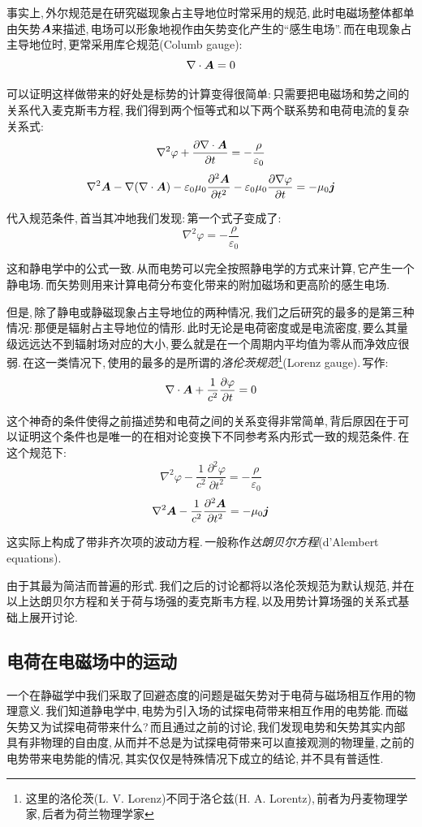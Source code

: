 事实上,\,外尔规范是在研究磁现象占主导地位时常采用的规范,\,此时电磁场整体都单由矢势$\boldsymbol{A}$来描述,\,电场可以形象地视作由矢势变化产生的``感生电场''.\,而在电现象占主导地位时,\,更常采用库仑规范(Columb gauge):
\[\nabla\cdot \boldsymbol{A}=0\]

可以证明这样做带来的好处是标势的计算变得很简单:\,只需要把电磁场和势之间的关系代入麦克斯韦方程,\,我们得到两个恒等式和以下两个联系势和电荷电流的复杂关系式:
\[\nabla^2\varphi+\frac{\partial\nabla\cdot\boldsymbol{A}}{\partial t}=-\frac{\rho}{\varepsilon_0}\]
\[\nabla^2\boldsymbol{A}-\nabla(\nabla\cdot\boldsymbol{A})-\varepsilon_0\mu_0\frac{\partial^2\boldsymbol{A}}{\partial t^2}-\varepsilon_0\mu_0\frac{\partial\nabla\varphi}{\partial t}=-\mu_0\boldsymbol{j}\]

代入规范条件,\,首当其冲地我们发现:\,第一个式子变成了:
\[\nabla^2\varphi=-\frac{\rho}{\varepsilon_0}\]

这和静电学中的公式一致.\,从而电势可以完全按照静电学的方式来计算,\,它产生一个静电场.\,而矢势则用来计算电荷分布变化带来的附加磁场和更高阶的感生电场.

但是,\,除了静电或静磁现象占主导地位的两种情况,\,我们之后研究的最多的是第三种情况:\,那便是辐射占主导地位的情形.\,此时无论是电荷密度或是电流密度,\,要么其量级远远达不到辐射场对应的大小,\,要么就是在一个周期内平均值为零从而净效应很弱.\,在这一类情况下,\,使用的最多的是所谓的\emph{洛伦茨规范}\footnote{这里的洛伦茨(L. V. Lorenz)不同于洛仑兹(H. A. Lorentz),\,前者为丹麦物理学家,\,后者为荷兰物理学家}(Lorenz gauge).\,写作:
\[\nabla\cdot\boldsymbol{A}+\frac{1}{c^2}\frac{\partial \varphi}{\partial t}=0\]

这个神奇的条件使得之前描述势和电荷之间的关系变得非常简单,\,背后原因在于可以证明这个条件也是唯一的在相对论变换下不同参考系内形式一致的规范条件.\,在这个规范下:
\[\nabla^2\varphi-\frac{1}{c^2}\frac{\partial^2\varphi}{\partial t^2}=-\frac{\rho}{\varepsilon_0}\]
\[\nabla^2\boldsymbol{A}-\frac{1}{c^2}\frac{\partial^2\boldsymbol{A}}{\partial t^2}=-\mu_0\boldsymbol{j}\]

这实际上构成了带非齐次项的波动方程.\,一般称作\emph{达朗贝尔方程}(d'Alembert equations).

由于其最为简洁而普遍的形式.\,我们之后的讨论都将以洛伦茨规范为默认规范,\,并在以上达朗贝尔方程和关于荷与场强的麦克斯韦方程,\,以及用势计算场强的关系式基础上展开讨论.



\subsection{电荷在电磁场中的运动}

一个在静磁学中我们采取了回避态度的问题是磁矢势对于电荷与磁场相互作用的物理意义.\,我们知道静电学中,\,电势为引入场的试探电荷带来相互作用的电势能.\,而磁矢势又为试探电荷带来什么?\,而且通过之前的讨论,\,我们发现电势和矢势其实内部具有非物理的自由度,\,从而并不总是为试探电荷带来可以直接观测的物理量,\,之前的电势带来电势能的情况,\,其实仅仅是特殊情况下成立的结论,\,并不具有普适性.

